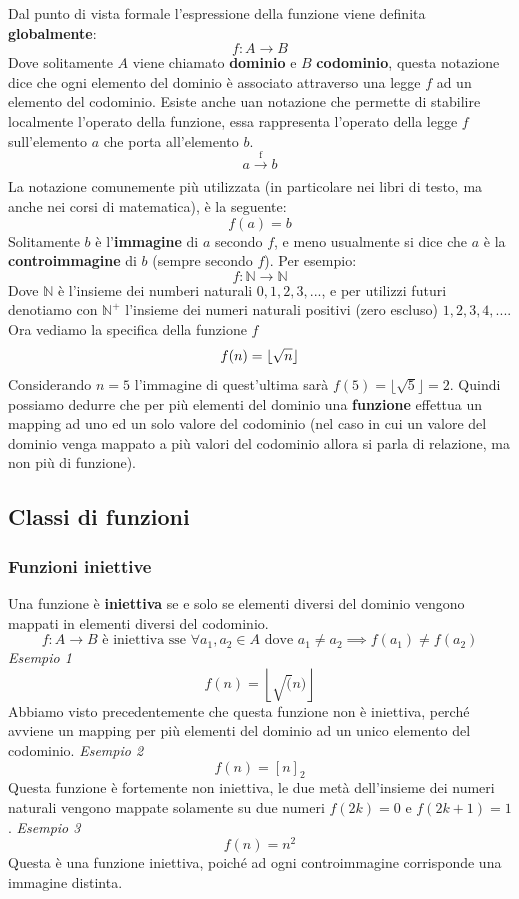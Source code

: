 \documentclass{article}
\begin{document}
Dal punto di vista formale l'espressione della funzione viene definita \textbf{globalmente}:
$$f:A\rightarrow B$$
Dove solitamente $A$ viene chiamato \textbf{dominio} e $B$ \textbf{codominio}, questa notazione dice che ogni elemento del dominio è associato attraverso una legge $f$ ad un elemento del codominio. Esiste anche uan notazione che permette di stabilire localmente l'operato della funzione, essa rappresenta l'operato della legge $f$ sull'elemento $a$ che porta all'elemento $b$.
$$a \xrightarrow[\text{}]{\text{f}} b$$
\newline
La notazione comunemente più utilizzata (in particolare nei libri di testo, ma anche nei corsi di matematica), è la seguente:
$$f(a)=b$$
Solitamente $b$ è l'\textbf{immagine} di $a$ secondo $f$, e meno usualmente si dice che $a$ è la \textbf{controimmagine} di $b$ (sempre secondo $f$).
\newline
\newline
Per esempio:
$$f:\mathbb{N} \rightarrow \mathbb{N}$$
Dove $\mathbb{N}$ è l'insieme dei numberi naturali ${0,1,2,3,...}$, e per utilizzi futuri denotiamo con $\mathbb{N}^+$ l'insieme dei numeri naturali positivi (zero escluso) ${1,2,3,4,...}$.
\newline
Ora vediamo la specifica della funzione $f$
$$f(n)=\lfloor \sqrtsign{n}\rfloor$$
Considerando $n=5$ l'immagine di quest'ultima sarà $f(5)=\lfloor\sqrt{5}\rfloor=2$.
\newline
Quindi possiamo dedurre che per più elementi del dominio una \textbf{funzione} effettua un mapping ad uno ed un solo valore del codominio (nel caso in cui un valore del dominio venga mappato a più valori del codominio allora si parla di relazione, ma non più di funzione).
\subsection{Classi di funzioni}
\subsubsection{Funzioni iniettive}

Una funzione è \textbf{iniettiva} se e solo se elementi diversi del dominio vengono mappati in elementi diversi del codominio.
$$f:A\rightarrow B\text{ è iniettiva sse } \forall a_1,a_2\in A \text{ dove } a_1\neq a_2 \implies f(a_1)\neq f(a_2)$$
\newline
\textit{Esempio 1}
$$f(n)=\left\lfloor\sqrt(n)\right\rfloor$$
Abbiamo visto precedentemente che questa funzione non è iniettiva, perché avviene un mapping per più elementi del dominio ad un unico elemento del codominio.
\newline
\newline
\textit{Esempio 2}
$$f(n)=[n]_2$$
Questa funzione è fortemente non iniettiva, le due metà dell'insieme dei numeri naturali vengono mappate solamente su due numeri $f(2k)=0$ e $f(2k+1)=1$.
\newline
\newline
\textit{Esempio 3}
$$f(n)=n^2$$
Questa è una funzione iniettiva, poiché ad ogni controimmagine corrisponde una immagine distinta.
\end{document}

